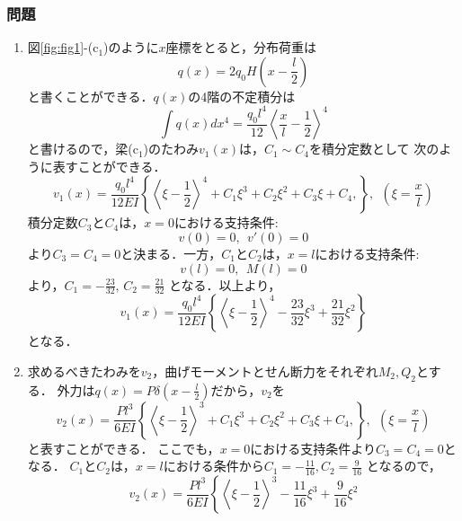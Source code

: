 \documentclass[10pt,a4j]{jarticle}
\begin{document}
\subsubsection*{問題}
\begin{enumerate}
\item
図\ref{fig:fig1}-(c$_1$)のように$x$座標をとると，分布荷重は
\begin{equation}
	q(x)=2q_0H\left(x-\frac{l}{2}\right)
\end{equation}
と書くことができる．$q(x)$の4階の不定積分は
\begin{equation}
	\int q(x) dx^4
	= 
	\frac{q_0l^4}{12}
	\left< \frac{x}{l} -\frac{1}{2}\right> ^4
\end{equation}
と書けるので，梁(c$_1$)のたわみ$v_1(x)$は，$C_1\sim C_4$を積分定数として
次のように表すことができる．
	\begin{equation}
	v_1(x)=\frac{q_0l^4}{12EI}\left\{
		\left< \xi -\frac{1}{2} \right> ^4
		+
		C_1 \xi^3 + C_2 \xi^2 + C_3 \xi + C_4,
	\right\},
	\  \	
		\left(\xi=\frac{x}{l}\right)
	\end{equation}
積分定数$C_3$と$C_4$は，$x=0$における支持条件:
\begin{equation}
		v(0)=0,\ \  v'(0)=0
\end{equation}
より$C_3=C_4=0$と決まる．一方，$C_1$と$C_2$は，$x=l$における支持条件:
\begin{equation}
	v(l)=0,\ \  M(l)=0
\end{equation}
より，$C_1=-\frac{23}{32},\, C_2=\frac{21}{32}$
となる．以上より，
	\begin{equation}
	v_1(x)=\frac{q_0l^4}{12EI}\left\{
		\left< \xi -\frac{1}{2}\right> ^4
		-
		\frac{23}{32}
		\xi^3
		+
		\frac{21}{32}
		\xi^2
	\right\}
	\label{eqn:vx1}
	\end{equation}
となる．
\item
求めるべきたわみを$v_2$，曲げモーメントとせん断力をそれぞれ$M_2,Q_2$とする．
外力は$q(x)=P\delta(x-\frac{l}{2})$だから，$v_2$を
	\begin{equation}
	v_2(x)=\frac{Pl^3}{6EI}\left\{
		\left< \xi -\frac{1}{2} \right>^3
		+
		C_1 \xi^3 + C_2 \xi^2 + C_3 \xi + C_4,
	\right\}, 
	\  \	
		\left(\xi=\frac{x}{l}\right)
	\end{equation}
と表すことができる．
ここでも，$x=0$における支持条件より$C_3=C_4=0$となる．
$C_1$と$C_2$は，$x=l$における条件から$C_1=-\frac{11}{16},C_2=\frac{9}{16}$
となるので，
	\begin{equation}
	v_2(x)=\frac{Pl^3}{6EI}\left\{
		\left< \xi -\frac{1}{2} \right>^3
		-\frac{11}{16}\xi^3 + \frac{9}{16}\xi^2 

\end{equation}
\end{enumerate}
\end{document}
